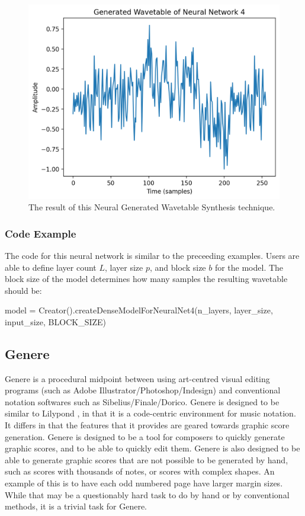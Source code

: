 \documentclass{article}
\begin{document}
\begin{figure}[h]
	\centering
	\includegraphics[width=0.8\columnwidth]{images/nn4.png}
	\caption{The result of this Neural Generated Wavetable Synthesis technique.}
\end{figure}

\subsubsection{Code Example}
The code for this neural network is similar to the preceeding examples. Users are able to define layer count $L$, layer size $p$, and block size $b$ for the model. The block size of the model determines how many samples the resulting wavetable should be:

\begin{ffcode}
	model = Creator().createDenseModelForNeuralNet4(n_layers, layer_size, input_size, BLOCK_SIZE)
\end{ffcode}

\subsection{Genere}
Genere is a procedural midpoint between using art-centred visual editing programs (such as Adobe Illustrator/Photoshop/Indesign) and conventional notation softwares such as Sibelius/Finale/Dorico. Genere is designed to be similar to Lilypond \cite{nienhuys2003lilypond}, in that it is a code-centric environment for music notation. It differs in that the features that it provides are geared towards graphic score generation. Genere is designed to be a tool for composers to quickly generate graphic scores, and to be able to quickly edit them. Genere is also designed to be able to generate graphic scores that are not possible to be generated by hand, such as scores with thousands of notes, or scores with complex shapes. An example of this is to have each odd numbered page have larger margin sizes. While that may be a questionably hard task to do by hand or by conventional methods, it is a trivial task for Genere.
\end{document}

